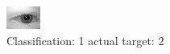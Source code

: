\begin{figure}[h!]
\begin{center}
\includegraphics[width=0.60\columnwidth]{figures/ID490_class_1_target_2.png}
\end{center}
\caption{ Classification: 1 actual target: 2}
\label{fig:ID490_class_1_target_2}
\end{figure}
